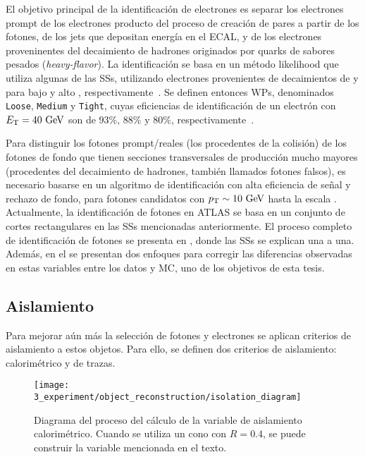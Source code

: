 El objetivo principal de la identificaci\'on de electrones es separar los electrones prompt de los electrones producto del proceso de creaci\'on de pares a partir de los fotones, de los jets que depositan energ\'ia en el \ac{ECAL}, y de los electrones proveninentes del decaimiento de hadrones originados por quarks de sabores pesados (\textit{heavy-flavor}). La identificaci\'on se basa en un m\'etodo likelihood que utiliza algunas de las \acp{SS}, utilizando electrones provenientes de decaimientos de \jpsi y \Zboson para bajo y alto \et, respectivamente~\cite{ATLAS-EGamma-Performance-2024}. Se definen entonces \acp{WP}, denominados \texttt{Loose}, \texttt{Medium} y \texttt{Tight}, cuyas eficiencias de identificaci\'on de un electr\'on con \(E_{\text{T}}=40~\text{GeV}\) son de \(93\%, \, 88\%\) y \(80\%\), respectivamente~\cite{ATLAS-EGamma-Calibration-2015-2016}.


Para distinguir los fotones prompt/reales (los procedentes de la colisión) de los fotones de fondo que tienen secciones transversales de producción mucho mayores (procedentes del decaimiento de hadrones, también llamados fotones falsos), es necesario basarse en un algoritmo de identificación con alta eficiencia de señal y rechazo de fondo, para fotones candidatos con \(p_{\text{T}} \sim 10~\text{GeV}\) hasta la escala \tev.
Actualmente, la identificación de fotones en \ac{ATLAS} se basa en un conjunto de cortes rectangulares en las \acp{SS} mencionadas anteriormente.
El proceso completo de identificación de fotones se presenta en \Ch{\ref{ch:pid_ss}}, donde las \acp{SS} se explican una a una. Además, en el \Ch{\ref{ch:ss_corrections}} se presentan dos enfoques para corregir las diferencias observadas en estas variables entre los datos y \ac{MC}, uno de los objetivos de esta tesis.





\subsection{Aislamiento}
\label{subsec:objects:egamma:iso}

Para mejorar aún más la selecci\'on de fotones y electrones se aplican criterios de aislamiento a estos objetos. Para ello, se definen dos criterios de aislamiento: calorim\'etrico y de trazas. 

\begin{figure}[ht!]
    \centering
    \texttt{[image: 3\_experiment/object\_reconstruction/isolation\_diagram]}
    \caption{Diagrama del proceso del c\'alculo de la variable de aislamiento calorim\'etrico. Cuando se utiliza un cono con \(R=0.4\), se puede construir la variable \etconefo mencionada en el texto.}
    \label{fig:objects:egamma:iso:iso_diagram}
\end{figure}

